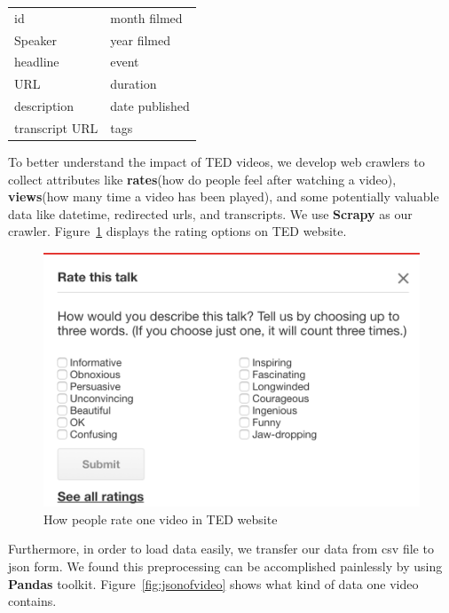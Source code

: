 \documentclass{report}
\numberwithin{figure}{section}
\begin{document}
\begin{center}
\begin{tabular}{l|l}
id & month filmed \\
Speaker & year filmed\\
headline & event\\
URL & duration \\
description & date published \\
transcript URL  & tags \\ 
 \end{tabular}
\end{center}


\quad To better understand the impact of TED videos, we develop web crawlers to collect attributes like \textbf{rates}(how do people feel after watching a video), \textbf{views}(how many time a video has been played), and some potentially valuable data like datetime, redirected urls, and transcripts. We use \textbf{Scrapy}\cite{scrapy}  as our crawler. Figure~\ref{fig:ratethistalk} displays the rating options on TED website.

\begin{figure} [h]
\begin{center}
\includegraphics[scale=0.4]{"ratethistalk"}
\caption{How people rate one video in TED website}
\label{fig:ratethistalk}
\end{center}
\end{figure}

Furthermore, in order to load data easily, we transfer our data from csv file to json form. We found this preprocessing can be accomplished painlessly by using  \textbf{Pandas}\cite{pandas} toolkit. Figure~\ref{fig:jsonofvideo} shows what kind of data one video contains.
\end{document}
